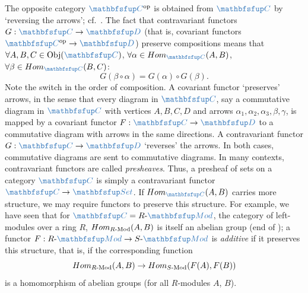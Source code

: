 The opposite category $\categ{C}^{\mathrm{op}}$ is obtained from
$\categ{C}$ by `reversing the arrows'; cf.\
. The fact that contravariant functors
$G : \categ{C} \to \categ{D}$ (that is, covariant functors
$\categ{C}^{\mathrm{op}} \to \categ{D}$) preserve compositions means
that $\forall A, B, C \in \mathrm{Obj}(\categ{C})$,
$\forall \alpha \in \Hom_{\categ{C}}(A, B)$,
$\forall \beta \in \Hom_{\categ{C}}(B, C)$:
\[
  G(\beta \circ \alpha) = G(\alpha) \circ G(\beta).
\]
Note the switch in the order of composition. A covariant functor
`preserves' arrows, in the sense that every diagram in $\categ{C}$,
say a commutative diagram in $\categ{C}$ with vertices $A, B, C, D$
and arrows $\alpha_1, \alpha_2, \alpha_3, \beta, \gamma$, is mapped by
a covariant functor $F : \categ{C} \to \categ{D}$ to a commutative
diagram with arrows in the same directions. A contravariant functor
$G : \categ{C} \to \categ{D}$ `reverses' the arrows. In both cases,
commutative diagrams are sent to commutative diagrams.  In many
contexts, contravariant functors are called \emph{presheaves}.  Thus,
a presheaf of sets on a category $\categ{C}$ is simply a contravariant
functor $\categ{C} \to \categ{Set}$.  If $\Hom_{\categ{C}}(A, B)$
carries more structure, we may require functors to preserve this
structure. For example, we have seen that for
$\categ{C} = R\text{-}\categ{Mod}$, the category of left-modules over
a ring $R$, $Hom_{R\text{-}\mathrm{Mod}}(A, B)$ is itself an abelian
group (end of \Cref{subsec:rings:the-category-r-mod}); a functor
$F : R\text{-}\categ{Mod} \to S\text{-}\categ{Mod}$ is \emph{additive}
if it preserves this structure, that is, if the corresponding function
\[
  Hom_{R\text{-}\mathrm{Mod}}(A, B) \to
  Hom_{S\text{-}\mathrm{Mod}}(F(A), F(B))
\]
is a homomorphism of abelian groups (for all $R$-modules $A$, $B$).

